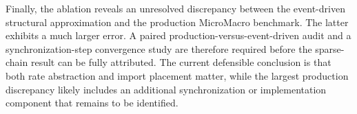 Finally, the ablation reveals an unresolved discrepancy between the event-driven structural approximation and the production MicroMacro benchmark.  The latter exhibits a much larger error.  A paired production-versus-event-driven audit and a synchronization-step convergence study are therefore required before the sparse-chain result can be fully attributed.  The current defensible conclusion is that both rate abstraction and import placement matter, while the largest production discrepancy likely includes an additional synchronization or implementation component that remains to be identified.
